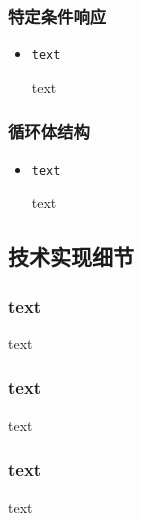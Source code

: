 \subsubsection{特定条件响应}
\begin{itemize}
    \item \begin{verbatim}text\end{verbatim}text
\end{itemize}


\subsubsection{循环体结构}
\begin{itemize}
    \item \begin{verbatim}text\end{verbatim}text
\end{itemize}

\subsection{技术实现细节}
\subsubsection{text}
text
\subsubsection{text}
text
\subsubsection{text}
text
